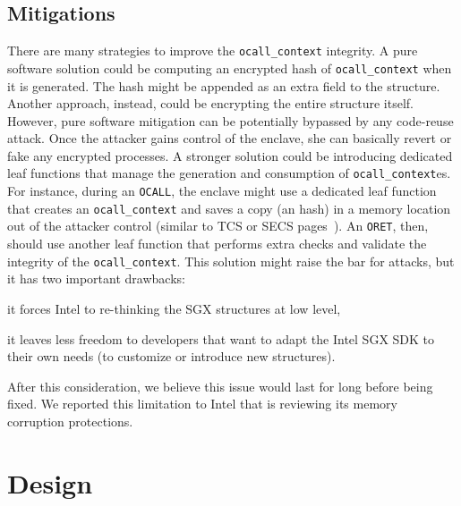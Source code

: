 \subsection{Mitigations}
\label{ssec:ocall-limitation}
There are many strategies to improve the \texttt{ocall\_context} integrity. 
A pure software solution could be computing an encrypted hash of 
\texttt{ocall\_context} when it is generated.
The hash might be appended as an extra field to the structure.
Another approach, instead, could be encrypting the entire structure itself.
However, pure software mitigation can be potentially bypassed by any 
code-reuse attack.
Once the attacker gains control of the enclave, she can basically revert or 
fake any encrypted processes.
A stronger solution could be introducing dedicated leaf functions that manage 
the generation and consumption of \texttt{ocall\_context}es.
For instance, during an \texttt{OCALL}, the enclave might use a dedicated leaf 
function that creates an \texttt{ocall\_context} and saves a 
copy (\ie an hash) in a memory location out of the attacker control (similar to 
TCS or SECS pages~\cite{costan2016intel}).
An \texttt{ORET}, then, should use another leaf function that performs extra 
checks and validate the integrity of the \texttt{ocall\_context}.
This solution might raise the bar for attacks, but it has two important 
drawbacks:
\begin{enumerate*}[label=(\roman*)]
	\item it forces Intel to re-thinking the SGX structures at low level,
	\item it leaves less freedom to developers that want to adapt the Intel SGX 
	SDK to their own needs (\eg to customize or introduce new structures).
\end{enumerate*}
After this consideration, we believe this issue would last for long before being
fixed. We reported this limitation to Intel that is reviewing its 
memory corruption protections.

\section{Design}
\label{sec:enclavekit}


